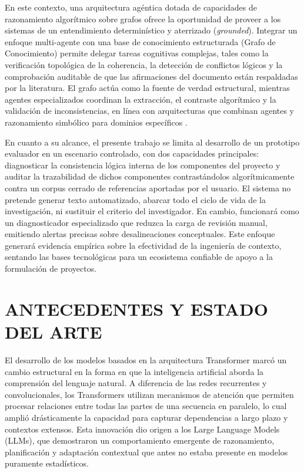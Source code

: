 \documentclass[12pt,letterpaper]{article}
\begin{document}
En este contexto, una arquitectura agéntica dotada de capacidades de razonamiento algorítmico sobre grafos ofrece la oportunidad de proveer a los sistemas de un entendimiento determinístico y aterrizado (\textit{grounded}). Integrar un enfoque multi-agente con una base de conocimiento estructurada (Grafo de Conocimiento) permite delegar tareas cognitivas complejas, tales como la verificación topológica de la coherencia, la detección de conflictos lógicos y la comprobación auditable de que las afirmaciones del documento están respaldadas por la literatura. El grafo actúa como la fuente de verdad estructural, mientras agentes especializados coordinan la extracción, el contraste algorítmico y la validación de inconsistencias, en línea con arquitecturas que combinan agentes y razonamiento simbólico para dominios específicos \citep{Bonifazi2025}.

En cuanto a su alcance, el presente trabajo se limita al desarrollo de un prototipo evaluador en un escenario controlado, con dos capacidades principales: diagnosticar la consistencia lógica interna de los componentes del proyecto y auditar la trazabilidad de dichos componentes contrastándolos algorítmicamente contra un corpus cerrado de referencias aportadas por el usuario. El sistema no pretende generar texto automatizado, abarcar todo el ciclo de vida de la investigación, ni sustituir el criterio del investigador. En cambio, funcionará como un diagnosticador especializado que reduzca la carga de revisión manual, emitiendo alertas precisas sobre desalineaciones conceptuales. Este enfoque generará evidencia empírica sobre la efectividad de la ingeniería de contexto, sentando las bases tecnológicas para un ecosistema confiable de apoyo a la formulación de proyectos.
\newpage
\section{ANTECEDENTES Y ESTADO DEL ARTE}
\vspace{-0.5cm}

El desarrollo de los modelos basados en la arquitectura Transformer \citep{Vaswani2017} marcó un cambio estructural en la forma en que la inteligencia artificial aborda la comprensión del lenguaje natural. A diferencia de las redes recurrentes y convolucionales, los Transformers utilizan mecanismos de atención que permiten procesar relaciones entre todas las partes de una secuencia en paralelo, lo cual amplió drásticamente la capacidad para capturar dependencias a largo plazo y contextos extensos. Esta innovación dio origen a los Large Language Models (LLMs), que demostraron un comportamiento emergente \citep{Long2022} de razonamiento, planificación y adaptación contextual que antes no estaba presente en modelos puramente estadísticos.
\end{document}

